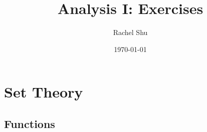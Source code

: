 \documentclass[notitlepage]{report}
\title{Analysis I: Exercises}
\author{Rachel Shu}
\date{\today}
\newif\ifmainfile
\begin{document}
\mainfiletrue

\maketitle
\tableofcontents

\addtocounter{chapter}{2}
\chapter{Set Theory}

\addtocounter{section}{2}
\section{Functions}

\end{document}
